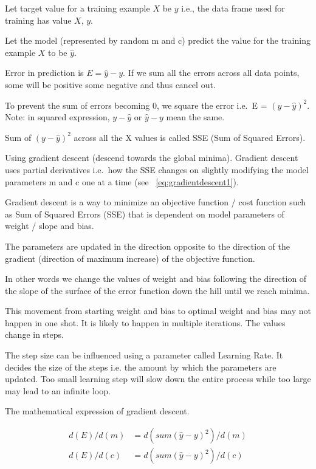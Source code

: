	\begin{bulletedlist}
		\item Let target value for a training example $X$ be $y$ i.e., the data frame used for training has value $X$, $y$.
		\item Let the model (represented by random m and c) predict the value for the training example $X$ to be $\hat{y}$.
		\item Error in prediction is $E = \hat{y} - y$. If we sum all the errors across all data points, some will be positive some negative and thus cancel out.
		\item To prevent the sum of errors becoming 0, we square the error i.e.\ E = $(y - \hat{y})^2$. Note: in squared expression, $y - \hat{y}$ or $\hat{y} - y$ mean the same.
		\item Sum of $(y - \hat{y})^2$ across all the X values is called SSE (Sum of Squared Errors).
		\item Using gradient descent (descend towards the global minima). Gradient descent uses partial derivatives i.e.\ how the SSE changes on slightly modifying the model parameters m and c one at a time (see \equationname~\ref{eq:gradientdescent1}).
		\item Gradient descent is a way to minimize an objective function / cost function such as Sum of Squared Errors (SSE) that is dependent on model parameters of weight / slope and bias.
		\item The parameters are updated in the direction opposite to the direction of the gradient (direction of maximum increase) of the objective function.
		\item In other words we change the values of weight and bias following the direction of the slope of the surface of the error function down the hill until we reach minima.
		\item This movement from starting weight and bias to optimal weight and bias may not happen in one shot.  It is likely to happen in multiple iterations. The values change in steps.
		\item The step size can be influenced using a parameter called Learning Rate. It decides the size of the steps i.e. the amount by which the parameters are updated. Too small  learning step will slow down the entire process while too large may lead to an infinite loop.
		\item The mathematical expression of gradient descent.
	\end{bulletedlist}

	\begin{align}
		d(E) / d(m) &= d(sum(\hat{y} - y)^2) / d(m) \\
		d(E) / d(c) &= d(sum(\hat{y} - y)^2) / d(c)
		\label{eq:gradientdescent1}
	\end{align}

